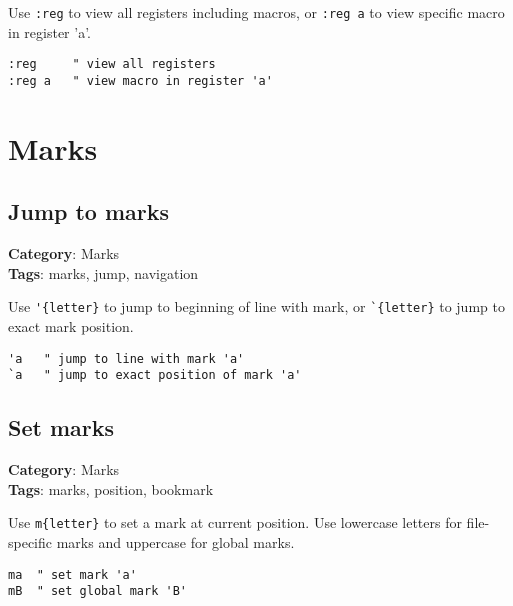 {{{{{{{Use {\footnotesize \Verb§:reg§} to view all registers including macros, or {\footnotesize \Verb§:reg a§} to view specific macro in register 'a'.

\begin{Exa*}{}
\begin{Verbatim}[fontsize=\footnotesize, breaklines, breakanywhere]
:reg     " view all registers
:reg a   " view macro in register 'a'
\end{Verbatim}
\end{Exa*}

\chapter{Marks}
\section{Jump to marks}

\textbf{Category}: Marks\\ \textbf{Tags}: marks, jump, navigation
\vspace{0.5cm}

Use {\footnotesize \Verb§'{letter}§} to jump to beginning of line with mark, or {\footnotesize \Verb§`{letter}§} to jump to exact mark position.

\begin{Exa*}{}
\begin{Verbatim}[fontsize=\footnotesize, breaklines, breakanywhere]
'a   " jump to line with mark 'a'
`a   " jump to exact position of mark 'a'
\end{Verbatim}
\end{Exa*}

\section{Set marks}

\textbf{Category}: Marks\\ \textbf{Tags}: marks, position, bookmark
\vspace{0.5cm}

Use {\footnotesize \Verb§m{letter}§} to set a mark at current position. Use lowercase letters for file-specific marks and uppercase for global marks.

\begin{Exa*}{}
\begin{Verbatim}[fontsize=\footnotesize, breaklines, breakanywhere]
ma  " set mark 'a'
mB  " set global mark 'B'
\end{Verbatim}
\end{Exa*}

}}}}}}}
